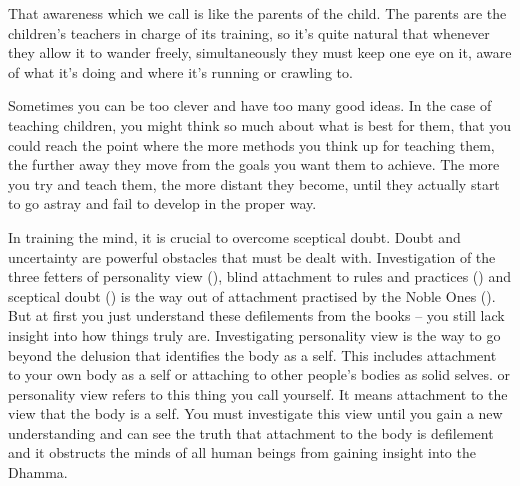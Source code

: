 That awareness which we call  is like the parents of the child. The parents are the children's teachers in charge of its training, so it's quite natural that whenever they allow it to wander freely, simultaneously they must keep one eye on it, aware of what it's doing and where it's running or crawling to.

Sometimes you can be too clever and have too many good ideas. In the case of teaching children, you might think so much about what is best for them, that you could reach the point where the more methods you think up for teaching them, the further away they move from the goals you want them to achieve. The more you try and teach them, the more distant they become, until they actually start to go astray and fail to develop in the proper way.

In training the mind, it is crucial to overcome sceptical doubt. Doubt and uncertainty are powerful obstacles that must be dealt with. Investigation of the three fetters of personality view (), blind attachment to rules and practices () and sceptical doubt () is the way out of attachment practised by the Noble Ones (). But at first you just understand these defilements from the books -- you still lack insight into how things truly are. Investigating personality view is the way to go beyond the delusion that identifies the body as a self. This includes attachment to your own body as a self or attaching to other people's bodies as solid selves.  or personality view refers to this thing you call yourself. It means attachment to the view that the body is a self. You must investigate this view until you gain a new understanding and can see the truth that attachment to the body is defilement and it obstructs the minds of all human beings from gaining insight into the Dhamma.

